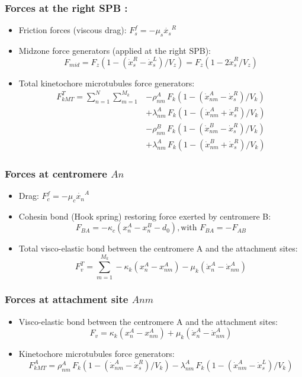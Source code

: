 \documentclass[a4paper,12pt]{article}
\begin{document}
\subsubsection{Forces at the right SPB :}
\begin{itemize}
\item Friction forces (viscous drag):  $F_s^f = -\mu_s \dot{x_s}^R$
\item Midzone force generators (applied at the right SPB): 
  $$F_{mid} = F_z\left(1 - (\dot{x}^R_s - \dot{x}_s^L)/V_z\right) =
  F_z\left(1 - 2\dot{x}^R_s / V_z\right) $$
\item Total kinetochore microtubules force generators:
  \begin{align}
    F_{kMT}^T = \sum_{n = 1}^{N}\sum_{m = 1}^{M_k} & - \rho_{nm}^A\,F_k\left( 1 -
      (\dot{x}^A_{nm} - \dot{x}^R_s)/V_k\right)\\
    & + \lambda_{nm}^A\,F_k\left(1 -
      (\dot{x}^A_{nm} + \dot{x}^R_s)/V_k\right)\\
    & - \rho_{nm}^B\,F_k\left( 1 -
      (\dot{x}^B_{nm} - \dot{x}^R_s)/V_k\right)\\
    & + \lambda_{nm}^A\,F_k\left(1 -
      (\dot{x}^B_{nm} + \dot{x}^R_s)/V_k\right)
  \end{align}
\end{itemize}

\subsubsection{Forces at centromere $An$}

\begin{itemize}
\item Drag: $F_c^f = -\mu_c \dot{x_n}^A$
\item Cohesin bond (Hook spring) restoring force exerted by centromere
  B: $$F_{BA} = -\kappa_c (x_n^A - x_n^B - d_0),
  \mbox{with } F_{BA} = - F_{AB}$$
\item Total visco-elastic bond between the centromere A and the attachment
  sites:
  $$ F_v^T = \sum_{m = 1}^{M_k} -\kappa_k(x_n^A - x_{nm}^A) 
  - \mu_k(\dot{x}_n^A - \dot{x}_{nm}^A) $$
\end{itemize}

\subsubsection{Forces at attachment site $Anm$}

\begin{itemize}
\item Visco-elastic bond between the centromere A and the
  attachment sites:
  $$F_v =  \kappa_k(x_n^A - x_{nm}^A) 
  + \mu_k(\dot{x}_n^A - \dot{x}_{nm}^A) $$
\item Kinetochore microtubules force generators:
  $$F_{kMT}^A = \rho_{nm}^A\,F_k\left(1 - (\dot{x}^A_{nm} -
    \dot{x}^R_s)/V_k\right) - \lambda_{nm}^A\,F_k\left(1 -
    (\dot{x}^A_{nm} - \dot{x}^L_s)/V_k\right) $$
\end{itemize}
\end{document}
